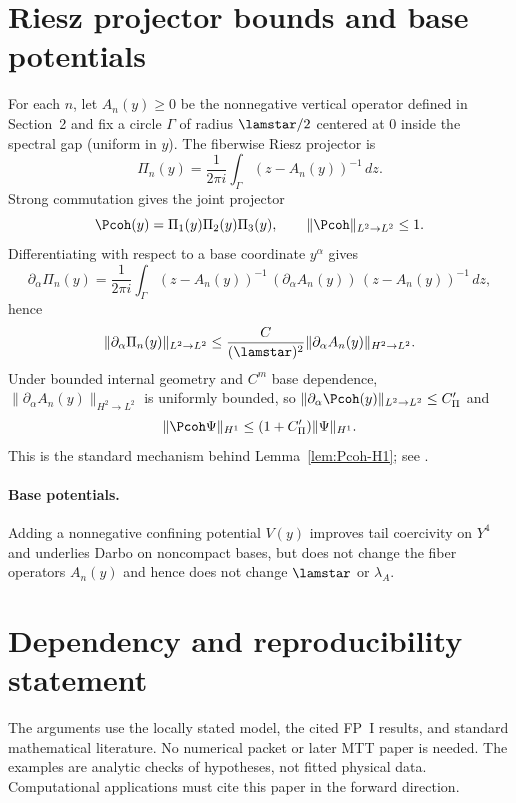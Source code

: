 \documentclass[11pt]{article}
\newcommand{\Yfour}{\ensuremath{Y^{4}}}
\newcommand{\Aop}{A}
\newcommand{\Ltwo}{\ensuremath{L^{2}}}
\begin{document}
\section{Riesz projector bounds and base potentials}
For each $n$, let $A_n(y)\ge0$ be the nonnegative vertical operator defined in
Section~2 and fix a circle $\Gamma$ of radius $\lamstar/2$ centered at $0$
inside the spectral gap (uniform in $y$).
The fiberwise Riesz projector is
\[
\Pi_n(y) = \frac{1}{2\pi i}\int_\Gamma (z-A_n(y))^{-1}\,dz.
\]
Strong commutation gives the joint projector
\[
\Pcoh(y)=\Pi_1(y)\Pi_2(y)\Pi_3(y),
\qquad
\|\Pcoh\|_{\Ltwo\to\Ltwo}\le 1.
\]
Differentiating with respect to a base coordinate $y^\alpha$ gives
\[
\partial_\alpha \Pi_n(y)
=\frac{1}{2\pi i}\int_\Gamma (z-A_n(y))^{-1}\,(\partial_\alpha A_n(y))\,(z-A_n(y))^{-1}\,dz,
\]
hence
\[
\|\partial_\alpha \Pi_n(y)\|_{\Ltwo\to\Ltwo}
\le \frac{C}{(\lamstar)^2}\|\partial_\alpha A_n(y)\|_{H^2\to \Ltwo}.
\]
Under bounded internal geometry and $C^m$ base dependence,
$\|\partial_\alpha A_n(y)\|_{H^2\to \Ltwo}$ is uniformly bounded,
so $\|\partial_\alpha \Pcoh(y)\|_{\Ltwo\to\Ltwo}\le C'_\Pi$ and
\[
\|\Pcoh \Psi\|_{H^1}\le (1+C'_\Pi)\|\Psi\|_{H^1}.
\]
This is the standard mechanism behind Lemma~\ref{lem:Pcoh-H1}; see \cite{Kato1976,Hebey2000}.

\paragraph{Base potentials.}
Adding a nonnegative confining potential $V(y)$ improves tail coercivity on $\Yfour$ and underlies Darbo on noncompact bases,
but does not change the fiber operators $A_n(y)$ and hence does not change $\lamstar$ or $\lambda_{\Aop}$.




\section*{Dependency and reproducibility statement}
The arguments use the locally stated model, the cited FP~I results, and
standard mathematical literature. No numerical packet or later MTT paper is
needed. The examples are analytic checks of hypotheses, not fitted physical
data. Computational applications must cite this paper in the forward direction.
\end{document}

